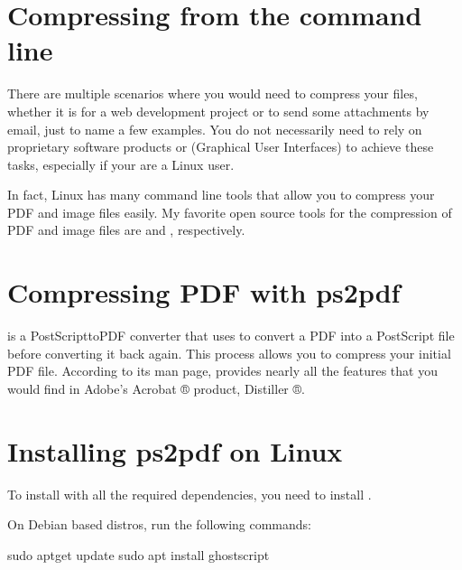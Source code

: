 \documentclass[a4paper,10pt,english,openany,oneside]{sphinxmanual}
\begin{document}
\section{Compressing from the command line}
\label{\detokenize{metadata-compression:compressing-from-the-command-line}}
\sphinxAtStartPar
There are multiple scenarios where you would need to compress your files, whether it is for a web development project or to send some attachments by email, just to name a few examples. You do not necessarily need to rely on proprietary software products or  (Graphical User Interfaces) to achieve these tasks, especially if your are a Linux user.

\sphinxAtStartPar
In fact, Linux has many command line tools that allow you to compress your PDF and image files easily. My favorite open source tools for the compression of PDF and image files are  and , respectively.


\section{Compressing PDF with ps2pdf}
\label{\detokenize{metadata-compression:compressing-pdf-with-ps2pdf}}
\sphinxAtStartPar
{} is a PostScript\sphinxhyphen{}to\sphinxhyphen{}PDF converter that uses  to convert a PDF into a PostScript file before converting it back again. This process allows you to compress your initial PDF file. According to its man page,  provides nearly all the features that you would find in Adobe’s Acrobat ® product, Distiller ®.


\section{Installing ps2pdf on Linux}
\label{\detokenize{metadata-compression:installing-ps2pdf-on-linux}}
\sphinxAtStartPar
To install  with all the required dependencies, you need to install .

\sphinxAtStartPar
On Debian based distros, run the following commands:

\begin{sphinxVerbatim}[commandchars=\\\{\}]
sudo apt\PYGZhy{}get update
sudo apt install ghostscript
\end{sphinxVerbatim}
\end{document}
